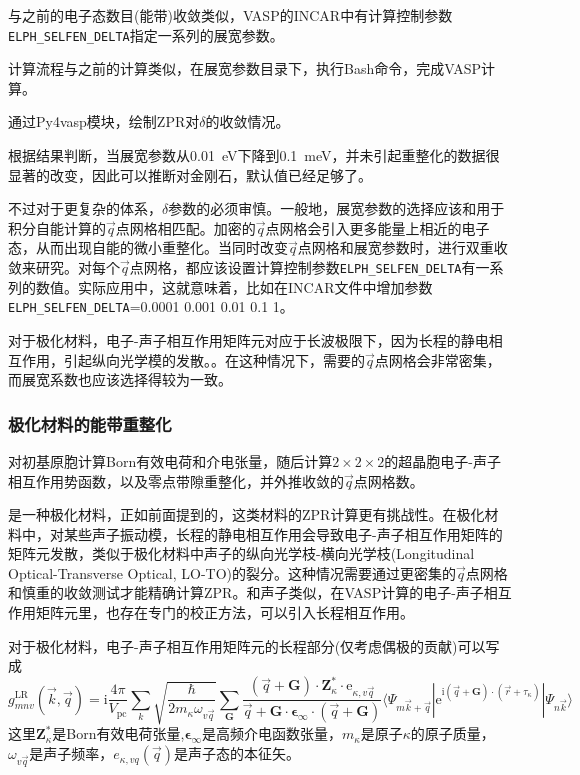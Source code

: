 与之前的电子态数目(能带)收敛类似，\textrm{VASP}的\textrm{INCAR}中有计算控制参数\texttt{ELPH\_SELFEN\_DELTA}指定一系列的展宽参数。

计算流程与之前的计算类似，在展宽参数目录下，执行\textrm{Bash}命令，完成\textrm{VASP}计算。

通过\textrm{Py4vasp}模块，绘制\textrm{ZPR}对$\delta$的收敛情况。

根据结果判断，当展宽参数从\textrm{0.01~eV}下降到\textrm{0.1~meV}，并未引起重整化的数据很显著的改变，因此可以推断对金刚石，默认值已经足够了。

不过对于更复杂的体系，$\delta$参数的必须审慎。一般地，展宽参数的选择应该和用于积分自能计算的$\vec q$点网格相匹配。加密的$\vec q$点网格会引入更多能量上相近的电子态，从而出现自能的微小重整化。当同时改变$\vec q$点网格和展宽参数时，进行双重收敛来研究。对每个$\vec q$点网格，都应该设置计算控制参数\texttt{ELPH\_SELFEN\_DELTA}有一系列的数值。实际应用中，这就意味着，比如在\textrm{INCAR}文件中增加参数\texttt{ELPH\_SELFEN\_DELTA}=0.0001 0.001 0.01 0.1 1。

对于极化材料，电子-声子相互作用矩阵元对应于长波极限下，因为长程的静电相互作用，引起纵向光学模的发散。。在这种情况下，需要的$\vec q$点网格会非常密集，而展宽系数也应该选择得较为一致。

\subsubsection{极化材料的能带重整化}
对初基原胞计算\textrm{Born}有效电荷和介电张量，随后计算$2\times2\times2$的超晶胞电子-声子相互作用势函数，以及零点带隙重整化，并外推收敛的$\vec q$点网格数。

是一种极化材料，正如前面提到的，这类材料的\textrm{ZPR}计算更有挑战性。在极化材料中，对某些声子振动模，长程的静电相互作用会导致电子-声子相互作用矩阵的矩阵元发散，类似于极化材料中声子的纵向光学枝-横向光学枝\textrm{(Longitudinal Optical-Transverse Optical, LO-TO)}的裂分。这种情况需要通过更密集的$\vec q$点网格和慎重的收敛测试才能精确计算\textrm{ZPR}。和声子类似，在\textrm{VASP}计算的电子-声子相互作用矩阵元里，也存在专门的校正方法，可以引入长程相互作用。

对于极化材料，电子-声子相互作用矩阵元的长程部分(仅考虑偶极的贡献)可以写成
\begin{displaymath}
	g_{mnv}^{\mathrm{LR}}(\vec k,\vec q)=\mathrm{i}\dfrac{4\pi}{V_{\mathrm{pc}}}\sum_k\sqrt{\dfrac{\hbar}{2m_{\kappa}\omega_{v\vec q}}}\sum_{\mathbf{G}}\dfrac{(\vec q+\mathbf{G})\cdot\mathbf{Z}_{\kappa}^{\ast}\cdot\mathrm{e}_{\kappa,v\vec q}}{\vec q+\mathbf{G}\cdot\mathbf{\epsilon}_{\infty}\cdot(\vec q+\mathbf{G})}\langle\Psi_{m\vec k+\vec q}|\mathrm{e}^{\mathrm{i}(\vec q+\mathbf{G})\cdot(\vec r+\tau_{\kappa})}|\Psi_{n\vec k}\rangle
\end{displaymath} 
这里$\mathbf{Z}_{\kappa}^{\ast}$是\textrm{Born}有效电荷张量,$\mathbf{\epsilon}_{\infty}$是高频介电函数张量，$m_{\kappa}$是原子$\kappa$的原子质量，$\omega_{v\vec q}$是声子频率，$e_{\kappa,vq}(\vec q)$是声子态的本征矢。


